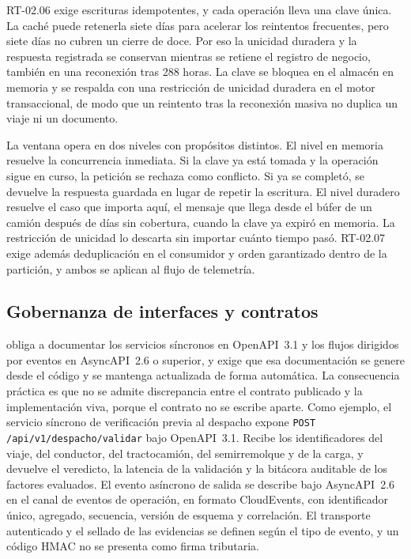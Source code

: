 RT-02.06 exige escrituras idempotentes, y cada operación lleva una clave única. La caché puede retenerla
siete días para acelerar los reintentos frecuentes, pero siete días no cubren un cierre de doce. Por eso
la unicidad duradera y la respuesta registrada se conservan mientras se retiene el registro de negocio,
también en una reconexión tras 288 horas. La clave se bloquea en el almacén en memoria y se respalda con
una restricción de unicidad duradera en el motor transaccional, de modo que un reintento tras la
reconexión masiva no duplica un viaje ni un documento.

La ventana opera en dos niveles con propósitos distintos. El nivel en memoria resuelve la concurrencia
inmediata. Si la clave ya está tomada y la operación sigue en curso, la petición se rechaza como
conflicto. Si ya se completó, se devuelve la respuesta guardada en lugar de repetir la escritura. El
nivel duradero resuelve el caso que importa aquí, el mensaje que llega desde el búfer de un camión
después de días sin cobertura, cuando la clave ya expiró en memoria. La restricción de unicidad lo
descarta sin importar cuánto tiempo pasó. RT-02.07 exige además deduplicación en el consumidor y orden
garantizado dentro de la partición, y ambos se aplican al flujo de telemetría.

\subsection{Gobernanza de interfaces y contratos}\label{sec:4-interfaces}

 obliga a documentar los servicios síncronos en OpenAPI~3.1 y los flujos dirigidos
por eventos en AsyncAPI~2.6 o superior, y exige que esa documentación se genere desde el código y se
mantenga actualizada de forma automática. La consecuencia práctica es que no se admite discrepancia
entre el contrato publicado y la implementación viva, porque el contrato no se escribe aparte. Como
ejemplo, el servicio síncrono de verificación previa al despacho expone \texttt{POST
/api/v1/despacho/validar} bajo OpenAPI~3.1. Recibe los identificadores del viaje, del conductor, del
tractocamión, del semirremolque y de la carga, y devuelve el veredicto, la latencia de la validación y la
bitácora auditable de los factores evaluados. El evento asíncrono de salida se describe bajo
AsyncAPI~2.6 en el canal de eventos de operación, en formato CloudEvents, con identificador único,
agregado, secuencia, versión de esquema y correlación. El transporte autenticado y el sellado de las
evidencias se definen según el tipo de evento, y un código HMAC no se presenta como firma tributaria.

